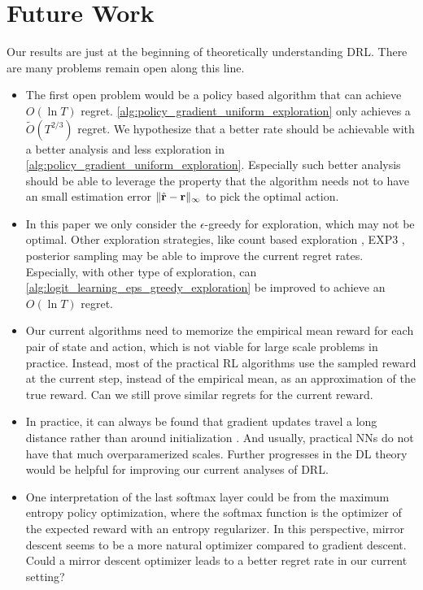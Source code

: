 \section{Future Work}
\label{sec:future_work}

Our results are just at the beginning of theoretically understanding DRL. There are many problems remain open along this line.
\begin{itemize}
    \item The first open problem would be a policy based algorithm that can achieve $O(\ln T)$ regret. \cref{alg:policy_gradient_uniform_exploration} only achieves a $\tilde{O}(T^{2/3})$ regret. We hypothesize that a better rate should be achievable with a better analysis and less exploration in \cref{alg:policy_gradient_uniform_exploration}. 
    Especially such better analysis should be able to leverage the property that the algorithm needs not to have an small estimation error $\|\hat{{\mathbf{r}}} - {\mathbf{r}}\|_\infty$ to pick the optimal action.
    \item In this paper we only consider the $\epsilon$-greedy for exploration, which may not be optimal. Other exploration strategies, like count based exploration \cite{auer2002finite}, EXP3 \citep{seldin2014one}, posterior sampling \citep{agrawal2012analysis} 
    may be able to improve the current regret rates. Especially, with other type of exploration, can \cref{alg:logit_learning_eps_greedy_exploration} be improved to achieve an $O(\ln T)$ regret.
    \item Our current algorithms need to memorize the empirical mean reward for each pair of state and action, which is not viable for large scale problems in practice. Instead, most of the practical RL algorithms use the sampled reward at the current step, instead of the empirical mean, as an approximation of the true reward. Can we still prove similar regrets for the current reward.
    \item In practice, it can always be found that gradient updates travel a long distance rather than around initialization \citep{liu2018deeptracker}. And usually, practical NNs do not have that much overparamerized scales. Further progresses in the DL theory would be helpful for improving our current analyses of DRL.
    \item One interpretation of the last softmax layer could be from the maximum entropy policy optimization, where the softmax function is the optimizer of the expected reward with an entropy regularizer\cite{nachum2017bridging}. In this perspective, mirror descent seems to be a more natural optimizer compared to gradient descent. Could a mirror descent optimizer leads to a better regret rate in our current setting?

\end{itemize}
